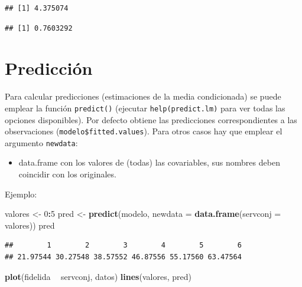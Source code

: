 \documentclass[]{book}
\newenvironment{Shaded}{\begin{snugshade}}{\end{snugshade}}
\newcommand{\KeywordTok}[1]{\textcolor[rgb]{0.13,0.29,0.53}{\textbf{#1}}}
\newcommand{\DataTypeTok}[1]{\textcolor[rgb]{0.13,0.29,0.53}{#1}}
\newcommand{\DecValTok}[1]{\textcolor[rgb]{0.00,0.00,0.81}{#1}}
\newcommand{\StringTok}[1]{\textcolor[rgb]{0.31,0.60,0.02}{#1}}
\newcommand{\OperatorTok}[1]{\textcolor[rgb]{0.81,0.36,0.00}{\textbf{#1}}}
\newcommand{\NormalTok}[1]{#1}
\providecommand{\tightlist}{%
  \setlength{\itemsep}{0pt}\setlength{\parskip}{0pt}}
\begin{document}
\begin{verbatim}
## [1] 4.375074
\end{verbatim}

\begin{Shaded}
\end{Shaded}

\begin{verbatim}
## [1] 0.7603292
\end{verbatim}

\section{Predicción}\label{prediccion}

Para calcular predicciones (estimaciones de la media condicionada) se
puede emplear la función \texttt{predict()} (ejecutar
\texttt{help(predict.lm)} para ver todas las opciones disponibles). Por
defecto obtiene las predicciones correspondientes a las observaciones
(\texttt{modelo\$fitted.values}). Para otros casos hay que emplear el
argumento \texttt{newdata}:

\begin{itemize}
\tightlist
\item
  data.frame con los valores de (todas) las covariables, sus nombres
  deben coincidir con los originales.
\end{itemize}

Ejemplo:

\begin{Shaded}
\begin{Highlighting}[]
\NormalTok{valores <-}\StringTok{ }\DecValTok{0}\OperatorTok{:}\DecValTok{5}
\NormalTok{pred <-}\StringTok{ }\KeywordTok{predict}\NormalTok{(modelo, }\DataTypeTok{newdata =} \KeywordTok{data.frame}\NormalTok{(}\DataTypeTok{servconj =}\NormalTok{ valores))}
\NormalTok{pred}
\end{Highlighting}
\end{Shaded}

\begin{verbatim}
##        1        2        3        4        5        6 
## 21.97544 30.27548 38.57552 46.87556 55.17560 63.47564
\end{verbatim}

\begin{Shaded}
\begin{Highlighting}[]
\KeywordTok{plot}\NormalTok{(fidelida }\OperatorTok{~}\StringTok{ }\NormalTok{servconj, datos)}
\KeywordTok{lines}\NormalTok{(valores, pred)}
\end{Highlighting}
\end{Shaded}
\end{document}
